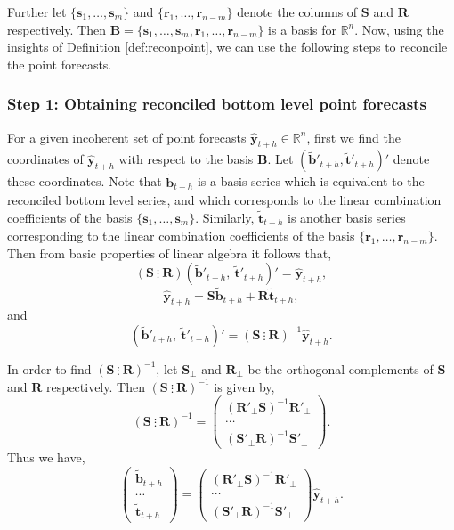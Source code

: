 \documentclass[a4paper, 11pt]{article}
\begin{document}
Further let $\{\bm{s}_1,\dots,\bm{s}_m\}$ and $\{\bm{r}_1,\dots,\bm{r}_{n-m}\}$ denote the columns of $\bm{S}$ and $\bm{R}$ respectively. Then $\bm{B}=\{\bm{s}_1,\dots,\bm{s}_m, \bm{r}_1,\dots,\bm{r}_{n-m}\}$ is a basis for $\mathbb{R}^n$. Now, using the insights of Definition \ref{def:reconpoint}, we can use the following steps to reconcile the point forecasts.

\subsubsection*{Step 1: Obtaining reconciled bottom level point forecasts}

For a given incoherent set of point forecasts $\hat{\bm{y}}_{t+h} \in \mathbb{R}^n$, first we find the coordinates of $\hat{\bm{y}}_{t+h}$ with respect to the basis $\bm{B}$. Let $(\tilde{\bm{b}}'_{t+h} , \tilde{\bm{t}}'_{t+h})'$ denote these coordinates. Note that $\tilde{\bm{b}}_{t+h}$ is a basis series which is equivalent to the reconciled bottom level series, and which corresponds to the linear combination coefficients of the basis $\{\bm{s}_1,\dots,\bm{s}_m\}$. Similarly, $\tilde{\bm{t}}_{t+h}$ is another basis series corresponding to the linear combination coefficients of the basis $\{\bm{r}_1,\dots,\bm{r}_{n-m}\}$. Then from basic properties of linear algebra it follows that, 
\[
(\bm{S} ~ \vdots~ \bm{R})
(\tilde{\bm{b}}'_{t+h},~ \tilde{\bm{t}}'_{t+h})'
= \hat{\bm{y}}_{t+h},
\]
\[
\hat{\bm{y}}_{t+h} = \bm{S}\tilde{\bm{b}}_{t+h} +  \bm{R}\tilde{\bm{t}}_{t+h},
\]
and
\begin{equation}\label{4.3}
(\tilde{\bm{b}}'_{t+h}, ~ \tilde{\bm{t}}'_{t+h})' =
(\bm{S} ~ \vdots~ \bm{R})^{-1}
\hat{\bm{y}}_{t+h}.
\end{equation}

In order to find $(\bm{S} ~ \vdots~ \bm{R})^{-1}$, let $\bm{S}_{\bot}$ and $\bm{R}_{\bot}$ be the orthogonal complements of $\bm{S}$ and $\bm{R}$
respectively. Then $(\bm{S} ~ \vdots~ \bm{R})^{-1}$ is given by,
\begin{equation}
(\bm{S} ~ \vdots~ \bm{R})^{-1} = \begin{pmatrix}
(\bm{R}'_\bot \bm{S})^{-1}\bm{R}'_\bot \\ \cdots \\ (\bm{S}'_\bot \bm{R})^{-1}\bm{S}'_\bot
\end{pmatrix}.
\end{equation}
Thus we have,
\begin{equation} \label{4.4}
\begin{pmatrix}
\tilde{\bm{b}}_{t+h} \\ \cdots \\ \tilde{\bm{t}}_{t+h}
\end{pmatrix} = \begin{pmatrix}
(\bm{R}'_\bot \bm{S})^{-1}\bm{R}'_\bot \\ \cdots \\ (\bm{S}'_\bot \bm{R})^{-1}\bm{S}'_\bot
\end{pmatrix}\hat{\bm{y}}_{t+h}.
\end{equation}
\end{document}

